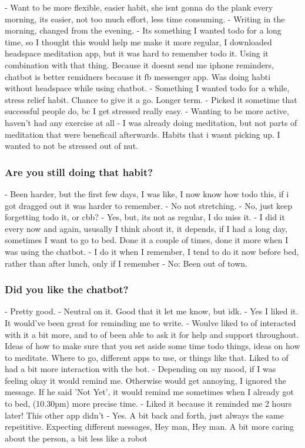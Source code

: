 \documentclass{scaffold/sigchi}
\begin{document}
- Want to be more flexible, easier habit, she isnt gonna do the plank every morning, its easier, not too much effort, less time consuming.
- Writing in the morning, changed from the evening.
- Its something I wanted todo for a long time, so I thought this would help me make it more regular, I downloaded headspace meditation app, but it was hard to remember todo it. Using it combination with that thing. Because it doesnt send me iphone reminders, chatbot is better remidners because it fb messenger app. Was doing habti without headspace while using chatbot.
- Something I wanted todo for a while, stress relief habit. Chance to give it a go. Longer term.
- Picked it sometime that successful people do, bc I get stressed really easy.
- Wanting to be more active, haven't had any exercise at all
- I was already doing meditation, but not parts of meditation that were beneficail afterwards. Habits that i wasnt picking up. I wanted to not be stressed out of nut.


\subsubsection{Are you still doing that habit?}

- Been harder, but the first few days, I was like, I now know how todo this, if i got dragged out it was harder to remember.
- No not stretching.
- No, just keep forgetting todo it, or cbb?
- Yes, but, its not as regular, I do miss it.
- I did it every now and again, ususally I think about it, it depends, if I had a long day, sometimes I want to go to bed. Done it a couple of times, done it more when I was using the chatbot.
- I do it when I remember, I tend to do it now before bed, rather than after lunch, only if I remember
- No: Been out of town.


\subsubsection{Did you like the chatbot?}

- Pretty good.
- Neutral on it. Good that it let me know, but idk.
- Yes I liked it. It would've been great for reminding me to write.
- Woulve liked to of interacted with it a bit more, and to of been able to ask it for help and support throughout. Ideas of how to make sure that you set aside some time todo things, ideas on how to meditate. Where to go, different apps to use, or things like that. Liked to of had a bit more interaction with the bot.
- Depending on my mood, if I was feeling okay it would remind me. Otherwise would get annoying, I ignored the message. If he said 'Not Yet', it would remind me sometimes when I already got to bed, (10.30pm) more precise time.
- Liked it because it reminded me 2 hours later! This other app didn't
- Yes. A bit back and forth, just always the same repeititive. Expecting different messages, Hey man, Hey man. A bit more caring about the person, a bit less like a robot
\end{document}
